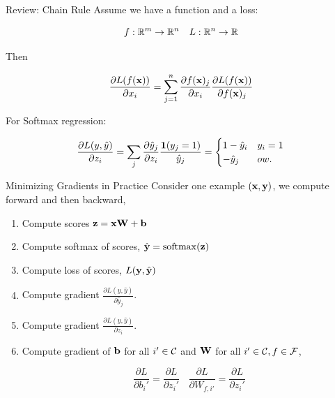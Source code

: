\documentclass{beamer}
\begin{document}
\begin{frame}{Review: Chain Rule}
  Assume we have a function and a loss:

  \[ f : \reals^m \rightarrow \reals^n \ \ \  L : \reals^n \rightarrow \reals \] 

  Then 

  \[ \frac{\partial L(f(\mathbf{x}))}{\partial x_i} = \sum_{j =1}^n \frac{\partial f(\mathbf{x})_j} {\partial  x_i} \frac{\partial L(f(\mathbf{x}))} {\partial f(\mathbf{x})_j}   \]

  \pause

  For Softmax regression:
  
  \[ \frac{\partial L(y, \hat{y})}{\partial z_i} = \sum_{j} \frac{\partial \hat{y}_j }{\partial z_i}  \frac{\mathbf{1}(y_j = 1)} {\hat{y}_j} =     \begin{cases}
      1 - \hat{y}_i & y_i = 1\\
      -\hat{y}_j & ow. \\
    \end{cases} \] 
\end{frame}



\begin{frame}{Minimizing Gradients in Practice}
  Consider one example $(\mathbf{x}, \mathbf{y})$, we compute forward and then backward,

  \begin{enumerate}
  \item Compute scores $\mathbf{z} =  \mathbf{x} \mathbf{W} + \mathbf{b}$  
  \item Compute softmax of scores, $\hat{\boldy} = \softmax(\boldz)$  
  \item Compute loss of scores, $L(\mathbf{y}, \hat{\mathbf{y}})$  

  \pause
  \item Compute gradient $\frac{\partial L(y, \hat{y})}{\partial \hat{y}_j}$.

  \item Compute gradient $\frac{\partial L(y, \hat{y})}{\partial z_i}$.

  \item Compute gradient of $\mathbf{b}$ for all $i'\in \mathcal{C}$ and $\mathbf{W}$ for all $i'\in \mathcal{C}, f \in \mathcal{F}$, 

  \[\frac{\partial L}{\partial b_i'} = 
    \frac{\partial L}{\partial z_i'} \ \ \ \ \frac{\partial L}{\partial W_{f, i'}} = 
     \frac{\partial L}{\partial z_i'}\]

  \end{enumerate}
\end{frame}
\end{document}
